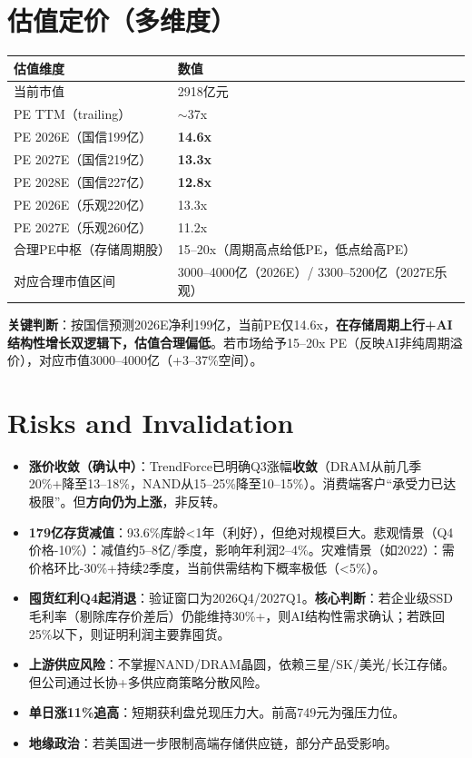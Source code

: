 \documentclass[a4paper,11pt,fontset=none]{ctexart}
\begin{document}
\section{估值定价（多维度）}

\begin{tabularx}{\textwidth}{L{4cm}X}
\toprule
\textbf{估值维度} & \textbf{数值} \\
\midrule
当前市值 & 2918亿元 \\
PE TTM（trailing） & $\sim$37x \\
PE 2026E（国信199亿） & \textbf{14.6x} \\
PE 2027E（国信219亿） & \textbf{13.3x} \\
PE 2028E（国信227亿） & \textbf{12.8x} \\
PE 2026E（乐观220亿） & 13.3x \\
PE 2027E（乐观260亿） & 11.2x \\
合理PE中枢（存储周期股） & 15--20x（周期高点给低PE，低点给高PE） \\
对应合理市值区间 & 3000--4000亿（2026E）/ 3300--5200亿（2027E乐观） \\
\bottomrule
\end{tabularx}

\textbf{关键判断}：按国信预测2026E净利199亿，当前PE仅14.6x，\textbf{在存储周期上行+AI结构性增长双逻辑下，估值合理偏低}。若市场给予15--20x PE（反映AI非纯周期溢价），对应市值3000--4000亿（+3--37\%空间）。

\section{Risks and Invalidation}

\begin{riskbox}
\begin{itemize}
  \item \textbf{涨价收敛（确认中）}：TrendForce已明确Q3涨幅\textbf{收敛}（DRAM从前几季20\%+降至13--18\%，NAND从15--25\%降至10--15\%）。消费端客户``承受力已达极限''。但\textbf{方向仍为上涨}，非反转。
  \item \textbf{179亿存货减值}：93.6\%库龄<1年（利好），但绝对规模巨大。悲观情景（Q4价格-10\%）：减值约5--8亿/季度，影响年利润2--4\%。灾难情景（如2022）：需价格环比-30\%+持续2季度，当前供需结构下概率极低（<5\%）。
  \item \textbf{囤货红利Q4起消退}：验证窗口为2026Q4/2027Q1。\textbf{核心判断}：若企业级SSD毛利率（剔除库存价差后）仍能维持30\%+，则AI结构性需求确认；若跌回25\%以下，则证明利润主要靠囤货。
  \item \textbf{上游供应风险}：不掌握NAND/DRAM晶圆，依赖三星/SK/美光/长江存储。但公司通过长协+多供应商策略分散风险。
  \item \textbf{单日涨11\%追高}：短期获利盘兑现压力大。前高749元为强压力位。
  \item \textbf{地缘政治}：若美国进一步限制高端存储供应链，部分产品受影响。
\end{itemize}
\end{riskbox}
\end{document}
